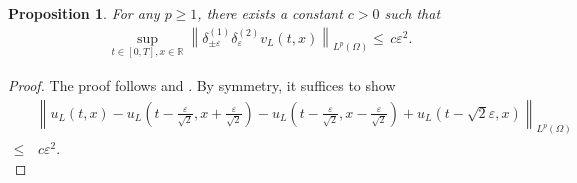 \documentclass[11pt,reqno]{amsart}
\numberwithin{equation}{section}
\newtheorem{proposition}[theorem]{Proposition}
\newcommand{\1}{{\bf 1}}
\newcommand{\2}{{\bf 2}}
\begin{document}
  
 
 \begin{proposition}\label{lem:rec_incr}  
     For any $p\ge1$,  there exists a constant $c>0$ such that 
 \begin{equation}
        \begin{split}
         \sup_{t\in [0,T], x\in \mathbb R} \left\|\delta_{\pm\varepsilon}^{(1)}\delta_{\varepsilon}^{(2)}  v_L(t, x) \right\|_{L^p(\Omega)}           \le  \,  c \varepsilon^{2}.
    \end{split}
    \end{equation}
         \end{proposition}
                 \begin{proof}  The proof  follows   \cite[Section 3]{AT21} and \cite[Lemma 2.7]{W2024}. By  symmetry,  it   suffices to show 
        \begin{equation}\label{eq uL est alt}
        \begin{split}
       &  \left\|u_L(t,x)-u_L\left(t-\frac{\varepsilon}{\sqrt{2}},x+\frac{\varepsilon}{\sqrt{2}}\right)-u_L\left(t-\frac{\varepsilon}{\sqrt{2}}, x-\frac{\varepsilon}{\sqrt{2}}\right)+u_L\left(t- \sqrt{2} \varepsilon, x\right)  \right\|_{L^p(\Omega)}\\
          \le &\,  c \varepsilon^{2}.
    \end{split}
    \end{equation}
         

\end{proof}
\end{document}
